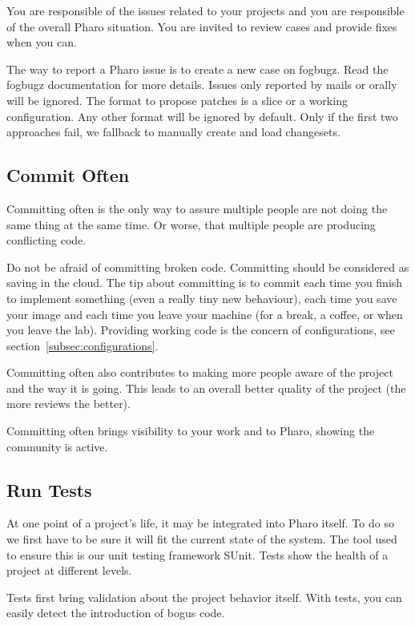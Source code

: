 \documentclass[10pt]{article}
\begin{document}
You are responsible of the issues related to your projects and you are responsible of the overall Pharo situation. You are invited to review cases and provide fixes when you can.

The way to report a Pharo issue is to create a new case on fogbugz. Read the fogbugz documentation for more details. Issues only reported by mails or orally will be ignored.
The format to propose patches is a slice or a working configuration. Any other format will be ignored by default. Only if the first two approaches fail, we fallback to manually create and load changesets.

\subsection{Commit Often}

Committing often is the only way to assure multiple people are not doing the same thing at the same time.
Or worse, that multiple people are producing conflicting code.

Do not be afraid of committing broken code. Committing should be considered as saving in the cloud. The tip about committing is to commit each time you finish to implement something (even a really tiny new behaviour), each time you save your image and each time you leave your machine (for a break, a coffee, or when you leave the lab). Providing working code is the concern of configurations, see section~\ref{subsec:configurations}.

Committing often also contributes to making more people aware of the project and the way it is going. This leads to an overall better quality of the project (the more reviews the better).

Committing often brings visibility to your work and to Pharo, showing the community is active.

\subsection{Run Tests}

At one point of a project's life, it may be integrated into Pharo itself.
To do so we first have to be sure it will fit the current state of the system.
The tool used to ensure this is our unit testing framework SUnit. Tests show the health of a project at different levels.

Tests first bring validation about the project behavior itself. With tests, you can easily detect the introduction of bogus code.
\end{document}
